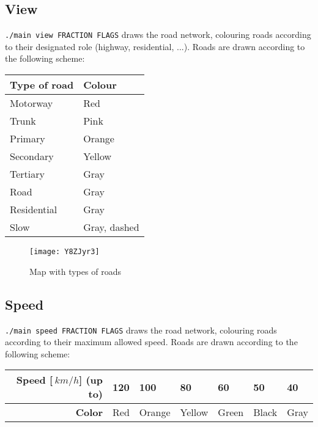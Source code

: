 \subsection{View}
\texttt{./main view FRACTION FLAGS} draws the road network, colouring roads according to their designated role (highway, residential, ...). Roads are drawn according to the following scheme:
\begin{center}
    \begin{tabular}{l | l}
        \textbf{Type of road} & \textbf{Colour} \\ \hline
        Motorway              & Red          \\
        Trunk                 & Pink         \\
        Primary               & Orange       \\
        Secondary             & Yellow       \\
        Tertiary              & Gray         \\
        Road                  & Gray         \\
        Residential           & Gray         \\
        Slow                  & Gray, dashed
    \end{tabular}
\end{center}

\begin{figure}[H]
    \centering
    \texttt{[image: Y8ZJyr3]}
    \caption{Map with types of roads}
\end{figure}

\subsection{Speed}
\texttt{./main speed FRACTION FLAGS} draws the road network, colouring roads according to their maximum allowed speed. Roads are drawn according to the following scheme:
\begin{center}
    \begin{tabular}{r | l l l l l l}
        \textbf{Speed [$\SI{}{km/h}$] (up to)} & 120 & 100    & 80     & 60    & 50    & 40 \\ \hline
        \textbf{Color}                         & Red & Orange & Yellow & Green & Black & Gray      
        \end{tabular}
\end{center}

